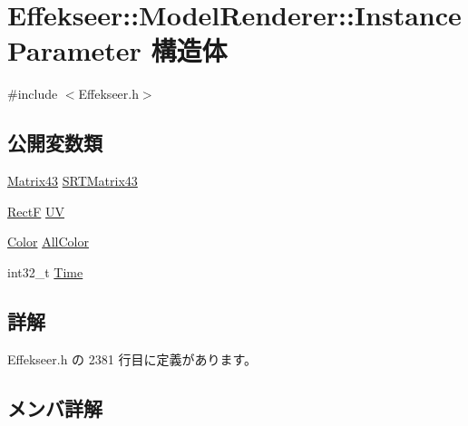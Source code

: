 \hypertarget{struct_effekseer_1_1_model_renderer_1_1_instance_parameter}{}\section{Effekseer\+:\+:Model\+Renderer\+:\+:Instance\+Parameter 構造体}
\label{struct_effekseer_1_1_model_renderer_1_1_instance_parameter}


{\ttfamily \#include $<$Effekseer.\+h$>$}

\subsection*{公開変数類}
\begin{DoxyCompactItemize}
\item 
\mbox{\hyperlink{struct_effekseer_1_1_matrix43}{Matrix43}} \mbox{\hyperlink{struct_effekseer_1_1_model_renderer_1_1_instance_parameter_a9f939c1f03b94d5c76eea7c7ff461da3}{S\+R\+T\+Matrix43}}
\item 
\mbox{\hyperlink{struct_effekseer_1_1_rect_f}{RectF}} \mbox{\hyperlink{struct_effekseer_1_1_model_renderer_1_1_instance_parameter_a8093686e2945cecdfcb99420bacca07d}{UV}}
\item 
\mbox{\hyperlink{struct_effekseer_1_1_color}{Color}} \mbox{\hyperlink{struct_effekseer_1_1_model_renderer_1_1_instance_parameter_a5d22e2c41cd40b037704fc7c41d7688a}{All\+Color}}
\item 
int32\+\_\+t \mbox{\hyperlink{struct_effekseer_1_1_model_renderer_1_1_instance_parameter_a4235d902c37f8a39353fc27bbc0ea532}{Time}}
\end{DoxyCompactItemize}


\subsection{詳解}


 Effekseer.\+h の 2381 行目に定義があります。



\subsection{メンバ詳解}
\mbox{\label{struct_effekseer_1_1_model_renderer_1_1_instance_parameter_a5d22e2c41cd40b037704fc7c41d7688a}} 
